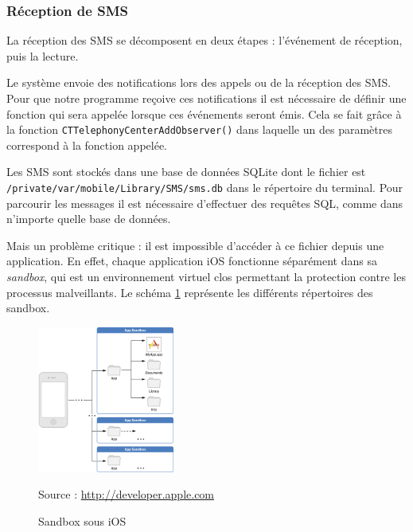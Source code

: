 \subsubsection{Réception de SMS}
\label{III_iOS_receptionSMS}

La réception des SMS se décomposent en deux étapes : l'événement de réception, puis la lecture.


Le système envoie des notifications lors des appels ou de la réception des SMS.
Pour que notre programme reçoive ces notifications il est nécessaire de définir une fonction qui sera appelée lorsque ces événements seront émis.
Cela se fait grâce à la fonction \lstinline{CTTelephonyCenterAddObserver()} dans laquelle un des paramètres correspond à la fonction appelée.




Les SMS sont stockés dans une base de données SQLite dont le fichier est \lstinline{/private/var/mobile/Library/SMS/sms.db} dans le répertoire du terminal.
Pour parcourir les messages il est nécessaire d'effectuer des requêtes SQL, comme dans n'importe quelle base de données.

Mais un problème critique : il est impossible d'accéder à ce fichier depuis une application.
En effet, chaque application iOS fonctionne séparément dans sa \textit{sandbox}, qui est un environnement virtuel clos permettant la protection contre les processus malveillants.
Le schéma \ref{iOS_sandbox} représente les différents répertoires des sandbox.
\begin{figure}[!h]
	\center
	\includegraphics[width=0.4\textwidth]{img/iOS_sandbox.png}
	\caption{Sandbox sous iOS}
	Source : \href{http://developer.apple.com/library/ios/#documentation/iphone/conceptual/iphoneosprogrammingguide/TheiOSEnvironment/TheiOSEnvironment.html}{http://developer.apple.com}
	\label{iOS_sandbox}
\end{figure}

